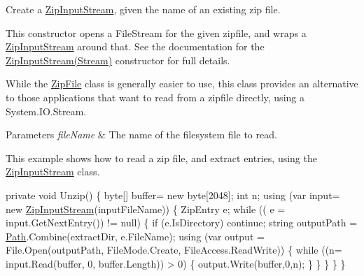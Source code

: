 Create a {\ttfamily \mbox{\hyperlink{class_super_tiled2_unity_1_1_ionic_1_1_zip_1_1_zip_input_stream}{Zip\+Input\+Stream}}}, given the name of an existing zip file. 

This constructor opens a {\ttfamily File\+Stream} for the given zipfile, and wraps a {\ttfamily \mbox{\hyperlink{class_super_tiled2_unity_1_1_ionic_1_1_zip_1_1_zip_input_stream}{Zip\+Input\+Stream}}} around that. See the documentation for the \mbox{\hyperlink{class_super_tiled2_unity_1_1_ionic_1_1_zip_1_1_zip_input_stream_af9203130f058abb23317725bcb98c047}{Zip\+Input\+Stream(\+Stream)}} constructor for full details. 

While the \mbox{\hyperlink{class_super_tiled2_unity_1_1_ionic_1_1_zip_1_1_zip_file}{Zip\+File}} class is generally easier to use, this class provides an alternative to those applications that want to read from a zipfile directly, using a System.\+I\+O.\+Stream. 


\begin{DoxyParams}{Parameters}
{\em file\+Name} & The name of the filesystem file to read. \\
\hline
\end{DoxyParams}


This example shows how to read a zip file, and extract entries, using the {\ttfamily \mbox{\hyperlink{class_super_tiled2_unity_1_1_ionic_1_1_zip_1_1_zip_input_stream}{Zip\+Input\+Stream}}} class.


\begin{DoxyCode}
\textcolor{keyword}{private} \textcolor{keywordtype}{void} Unzip()
\{
    byte[] buffer= \textcolor{keyword}{new} byte[2048];
    \textcolor{keywordtype}{int} n;
    \textcolor{keyword}{using} (var input= \textcolor{keyword}{new} \mbox{\hyperlink{class_super_tiled2_unity_1_1_ionic_1_1_zip_1_1_zip_input_stream_af9203130f058abb23317725bcb98c047}{ZipInputStream}}(inputFileName))
    \{
        ZipEntry e;
        \textcolor{keywordflow}{while} (( e = input.GetNextEntry()) != null)
        \{
            \textcolor{keywordflow}{if} (e.IsDirectory) \textcolor{keywordflow}{continue};
            \textcolor{keywordtype}{string} outputPath = \mbox{\hyperlink{namespace_path}{Path}}.Combine(extractDir, e.FileName);
            \textcolor{keyword}{using} (var output = File.Open(outputPath, FileMode.Create, FileAccess.ReadWrite))
            \{
                \textcolor{keywordflow}{while} ((n= input.Read(buffer, 0, buffer.Length)) > 0)
                \{
                    output.Write(buffer,0,n);
                \}
            \}
        \}
    \}
\}
\end{DoxyCode}



